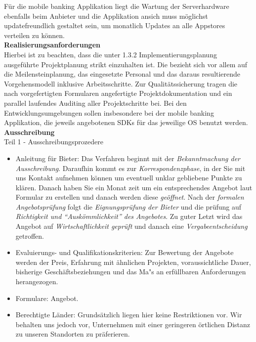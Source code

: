 F\"ur die mobile banking Applikation liegt die Wartung der Serverhardware ebenfalls beim Anbieter und die Applikation ansich muss m\"oglichst updatefreundlich gestaltet sein, um monatlich Updates an alle Appstores verteilen zu k\"onnen.\\

\textbf{Realisierungsanforderungen}\\
Hierbei ist zu beachten, dass die unter 1.3.2 Implementierungsplanung ausgef\"uhrte Projektplanung strikt einzuhalten ist. Die bezieht sich vor allem auf die Meilensteinplanung, das eingesetzte Personal und das daraus resultierende Vorgehensmodell inklusive Arbeitsschritte. Zur Qualit\"atssicherung tragen die nach vorgefertigten Formularen angefertigte Projektdokumentation und ein parallel laufendes Auditing aller Projektschritte bei. Bei den Entwicklungsumgebungen sollen insbesondere bei der mobile banking Applikation, die jeweils angebotenen SDKs f\"ur das jeweilige OS benutzt werden.\\

\textbf{Ausschreibung}\\

Teil 1 - Ausschreibungsprozedere
\begin{itemize}
	\item Anleitung f\"ur Bieter: Das Verfahren beginnt mit der \textit{Bekanntmachung der Ausschreibung}. Daraufhin kommt es zur \textit{Korrespondenzphase}, in der Sie mit uns Kontakt aufnehmen k\"onnen um eventuell unklar gebliebene Punkte zu kl\"aren. Danach haben Sie ein Monat zeit um ein entsprechendes Angebot laut Formular zu erstellen und danach werden diese \textit{ge\"offnet}. Nach der \textit{formalen Angebotspr\"ufung} folgt die \textit{Eignungspr\"ufung der Bieter} und die pr\"ufung auf \textit{Richtigkeit und ``Ausk\"ommlichkeit'' des Angebotes}. Zu guter Letzt wird das Angebot auf \textit{Wirtschaftlichkeit gepr\"uft} und danach eine \textit{Vergabeentscheidung} getroffen.
	\item Evaluierungs- und Qualifikationskriterien: Zur Bewertung der Angebote werden  der Preis, Erfahrung mit \"ahnlichen Projekten, voraussichtliche Dauer, bisherige Gesch\"aftsbeziehungen und das Ma"s an erf\"ullbaren Anforderungen herangezogen.
	\item Formulare: Angebot.
	\item Berechtigte L\"ander: Grunds\"atzlich liegen hier keine Restriktionen vor. Wir behalten uns jedoch vor, Unternehmen mit einer geringeren \"ortlichen Distanz zu unseren Standorten zu pr\"aferieren.
\end{itemize}

